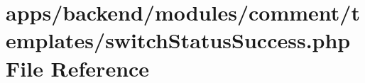 \hypertarget{comment_2templates_2switch_status_success_8php}{\section{apps/backend/modules/comment/templates/switch\-Status\-Success.php File Reference}
\label{comment_2templates_2switch_status_success_8php}
}
